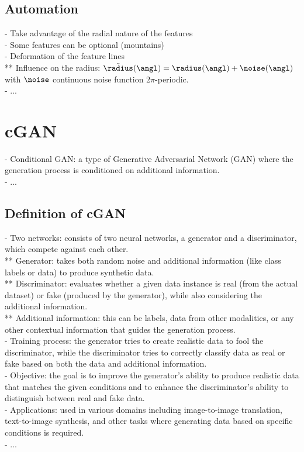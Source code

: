 \subsection{Automation}
- Take advantage of the radial nature of the features \\
- Some features can be optional (mountains) \\
- Deformation of the feature lines \\ 
** Influence on the radius: $\Tilde \radius(\angl) = \radius(\angl) + \noise(\angl)$ with $\noise$ continuous noise function $2\pi$-periodic. \\
- ...

\section{cGAN}
\label{sec:coral-island_cGAN}
- Conditional GAN: a type of Generative Adversarial Network (GAN) where the generation process is conditioned on additional information. \\
- ...

\subsection{Definition of cGAN}
- Two networks: consists of two neural networks, a generator and a discriminator, which compete against each other. \\
** Generator: takes both random noise and additional information (like class labels or data) to produce synthetic data. \\
** Discriminator: evaluates whether a given data instance is real (from the actual dataset) or fake (produced by the generator), while also considering the additional information. \\
** Additional information: this can be labels, data from other modalities, or any other contextual information that guides the generation process. \\
- Training process: the generator tries to create realistic data to fool the discriminator, while the discriminator tries to correctly classify data as real or fake based on both the data and additional information. \\
- Objective: the goal is to improve the generator's ability to produce realistic data that matches the given conditions and to enhance the discriminator's ability to distinguish between real and fake data. \\
- Applications: used in various domains including image-to-image translation, text-to-image synthesis, and other tasks where generating data based on specific conditions is required. \\
- ...

